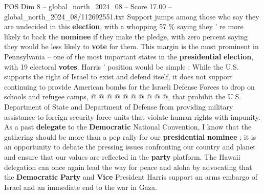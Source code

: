 \begin{textsample}{POS Dim 8 – global\_north\_2024\_08 – Score 17.00 – global\_north\_2024\_08/112692551.txt}
Support jumps among those who say they are undecided in this \textbf{election}, with a whopping 57 \% saying they ' re more likely to back the \textbf{nominee} if they make the pledge, with zero percent saying they would be less likely to \textbf{vote} for them.
This margin is the most prominent in Pennsylvania -- one of the most important states in the \textbf{presidential} \textbf{election}, with 19 electoral \textbf{votes}.
Harris ' position would be simple : While the U.S. supports the right of Israel to exist and defend itself, it does not support continuing to provide American bombs for the Israeli Defense Forces to drop on schools and refugee camps, @ @ @ @ @ @ @ @ @ @, that prohibit the U.S.
Department of State and Department of Defense from providing military assistance to foreign security force units that violate human rights with impunity.
As a past \textbf{delegate} to the \textbf{Democratic} National Convention, I know that the gathering should be more than a pep rally for our \textbf{presidential} \textbf{nominee} ; it is an opportunity to debate the pressing issues confronting our country and planet and ensure that our values are reflected in the \textbf{party} platform.
The Hawaii delegation can once again lead the way for peace and aloha by advocating that the \textbf{Democratic} \textbf{Party} and \textbf{Vice} President Harris support an arms embargo of Israel and an immediate end to the war in Gaza.

\end{textsample}
